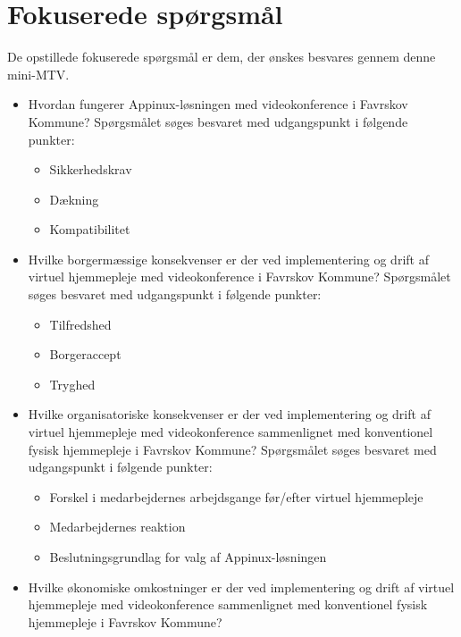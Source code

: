\section{Fokuserede spørgsmål}
De opstillede fokuserede spørgsmål er dem, der ønskes besvares gennem denne mini-MTV. 

\begin{itemize}
	\item Hvordan fungerer Appinux-løsningen med videokonference i Favrskov Kommune? Spørgsmålet søges besvaret med udgangspunkt i følgende punkter:
	\begin{itemize}
	\item Sikkerhedskrav
	\item Dækning %
	\item Kompatibilitet 
\end{itemize}
\end{itemize}

\begin{itemize}
	\item Hvilke borgermæssige konsekvenser er der ved implementering og drift af virtuel hjemmepleje med videokonference i Favrskov Kommune? Spørgsmålet søges besvaret med udgangspunkt i følgende punkter:
	\begin{itemize}
	\item Tilfredshed
	\item Borgeraccept
	\item Tryghed
\end{itemize}
\end{itemize}

\begin{itemize}
	\item Hvilke organisatoriske konsekvenser er der ved implementering og drift af virtuel hjemmepleje med videokonference sammenlignet med konventionel fysisk hjemmepleje i Favrskov Kommune? Spørgsmålet søges besvaret med udgangspunkt i følgende punkter:
	\begin{itemize}
	\item Forskel i medarbejdernes arbejdsgange før/efter virtuel hjemmepleje
	\item Medarbejdernes reaktion
	\item Beslutningsgrundlag for valg af Appinux-løsningen 
\end{itemize}
\end{itemize}


\begin{itemize}
	\item Hvilke økonomiske omkostninger er der ved implementering og drift af virtuel hjemmepleje med videokonference sammenlignet med konventionel fysisk hjemmepleje i Favrskov Kommune?
\end{itemize}

